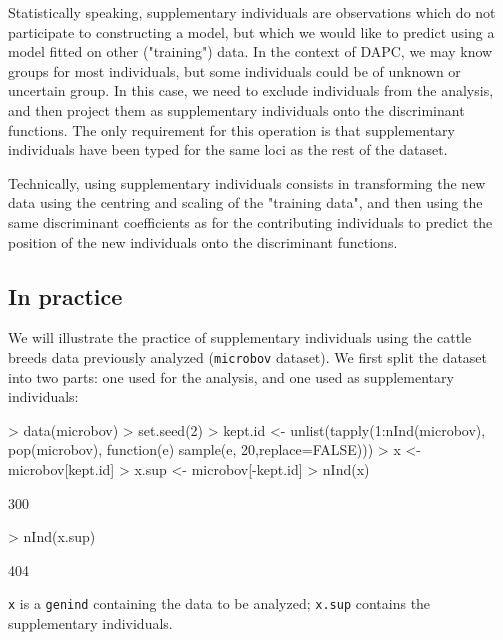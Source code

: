 \documentclass{article}
\begin{document}
Statistically speaking, supplementary individuals are observations which do not participate to
constructing a model, but which we would like to predict using a model fitted on other ("training") data.
In the context of DAPC, we may know groups for most individuals, but some individuals could be of
unknown or uncertain group. In this case, we need to exclude individuals from the analysis, and then
project them as supplementary individuals onto the discriminant functions.
The only requirement for this operation is that supplementary individuals have been typed for the
same loci as the rest of the dataset.

Technically, using supplementary individuals consists in transforming the new data using the centring
and scaling of the "training data", and then using the same discriminant coefficients as
for the contributing individuals to predict the position of the new individuals onto the
discriminant functions.


\subsection{In practice}
We will illustrate the practice of supplementary individuals using the cattle breeds data previously
analyzed (\texttt{microbov} dataset).
We first split the dataset into two parts: one used for the analysis, and one used as supplementary individuals:
\begin{Schunk}
\begin{Sinput}
> data(microbov)
> set.seed(2)
> kept.id <- unlist(tapply(1:nInd(microbov), pop(microbov), function(e) sample(e, 20,replace=FALSE)))
> x <- microbov[kept.id]
> x.sup <- microbov[-kept.id]
> nInd(x)
\end{Sinput}
\begin{Soutput}
[1] 300
\end{Soutput}
\begin{Sinput}
> nInd(x.sup)
\end{Sinput}
\begin{Soutput}
[1] 404
\end{Soutput}
\end{Schunk}
\texttt{x} is a \texttt{genind} containing the data to be analyzed; \texttt{x.sup} contains the
supplementary individuals.
\end{document}
